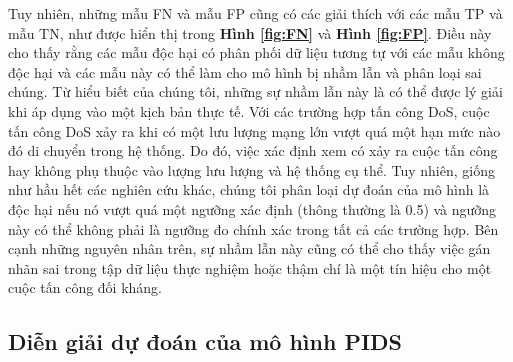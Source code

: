 \bigbreak\noindent
Tuy nhiên, những mẫu FN và mẫu FP cũng có các giải thích với các mẫu TP và mẫu TN, như được hiển thị trong \textbf{Hình \ref{fig:FN}} và \textbf{Hình \ref{fig:FP}}. Điều này cho thấy rằng các mẫu độc hại có phân phối dữ liệu tương tự với các mẫu không độc hại và các mẫu này có thể làm cho mô hình bị nhầm lẫn và phân loại sai chúng. Từ hiểu biết của chúng tôi, những sự nhầm lẫn này là có thể được lý giải khi áp dụng vào một kịch bản thực tế. Với các trường hợp tấn công DoS,  cuộc tấn công DoS xảy ra khi có một lưu lượng mạng lớn vượt quá một hạn mức nào đó di chuyển trong hệ thống. Do đó, việc xác định xem có xảy ra cuộc tấn công hay không phụ thuộc vào lượng lưu lượng và hệ thống cụ thể. Tuy nhiên, giống như hầu hết các nghiên cứu khác, chúng tôi phân loại dự đoán của mô hình là độc hại nếu nó vượt quá một ngưỡng xác định (thông thường là 0.5) và ngưỡng này có thể không phải là ngưỡng đo chính xác trong tất cả các trường hợp. Bên cạnh những nguyên nhân trên, sự nhầm lẫn này cũng có thể cho thấy việc gán nhãn sai trong tập dữ liệu thực nghiệm hoặc thậm chí là một tín hiệu cho một cuộc tấn công đối kháng.


\subsection{Diễn giải dự đoán của mô hình PIDS}

